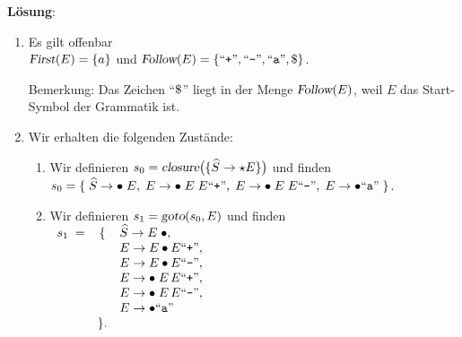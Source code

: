 \documentclass{article}
\newcommand{\solution}{
\vspace*{0.3cm}

\noindent
\textbf{L\"osung}: }
\newcommand{\quoted}[1]{\mbox{``\texttt{#1}''}}
\begin{document}
\solution
\begin{enumerate}
\item Es gilt offenbar
      \\[0.2cm]
      \hspace*{1.3cm}
      $\textsl{First}(E) = \{ a \}$ \quad und \quad
      $\textsl{Follow}(E) = \{ \quoted{+}, \quoted{-}, \quoted{a}, \symbol{36} \}$.

      Bemerkung: Das Zeichen ``$\symbol{36}$'' liegt in der Menge $\textsl{Follow}(E)$, weil 
      $E$ das Start-Symbol der Grammatik ist.
\item Wir erhalten die folgenden Zust\"ande:
      \begin{enumerate}
      \item Wir definieren $s_0 = \textsl{closure}\bigl(\{\widehat{S} \rightarrow \star E\}\bigr)$ und 
            finden
            \\[0.2cm]
            \hspace*{1.3cm}
            $s_0 = \{\; \widehat{S} \rightarrow \bullet\; E,\;
                      E \rightarrow \bullet \; E\; E \quoted{+},\; 
                      E \rightarrow \bullet \; E\; E \quoted{-},\;
                      E \rightarrow \bullet \quoted{a}\; 
            \}$.
      \item Wir definieren $s_1 = \textsl{goto}(s_0, E)$ und finden
            \\[0.2cm]
            \hspace*{1.3cm}
            $
            \begin{array}[t]{lcl}
            s_1 \;= & \{ & \widehat{S} \rightarrow E\; \bullet,             \\
                    &    & E \rightarrow E \bullet E \quoted{+},            \\
                    &    & E \rightarrow E \bullet E \quoted{-},            \\
                    &    & E \rightarrow \bullet\; E\, E \quoted{+},        \\
                    &    & E \rightarrow \bullet\; E\, E \quoted{-},        \\
                    &    & E \rightarrow \bullet \quoted{a}                \\
                    & \}.
            \end{array}
            $


\end{enumerate}
\end{enumerate}
\end{document}
